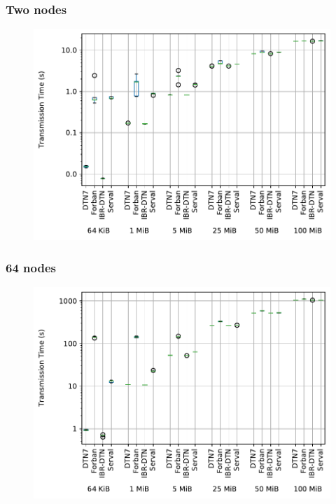 \begin{frame}
  \frametitle{Two nodes}

  \begin{figure}
    \includegraphics[width=\linewidth,keepaspectratio]{include/chain-runtimes-2}
  \end{figure}
\end{frame}

\begin{frame}
  \frametitle{64 nodes}

  \begin{figure}
    \includegraphics[width=\linewidth,keepaspectratio]{include/chain-runtimes-64}
  \end{figure}
\end{frame}
